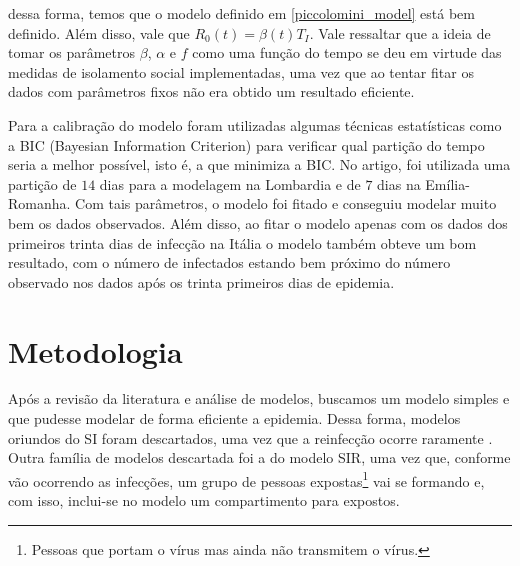 \documentclass{article}
\begin{document}
\noindent dessa forma, temos que o modelo definido em \ref{piccolomini_model} está bem definido. Além disso, vale que $R_0(t) = \beta(t)T_I$. Vale ressaltar que a ideia de tomar os parâmetros $\beta$, $\alpha$ e $f$ como uma função do tempo se deu em virtude das medidas de isolamento social implementadas, uma vez que ao tentar fitar os dados com parâmetros fixos não era obtido um resultado eficiente.

Para a calibração do modelo foram utilizadas algumas técnicas estatísticas como a BIC (Bayesian Information Criterion) para verificar qual partição do tempo seria a melhor possível, isto é, a que minimiza a BIC. No artigo, foi utilizada uma partição de $14$ dias para a modelagem na Lombardia e de $7$ dias na Emília-Romanha. Com tais parâmetros, o modelo foi fitado e conseguiu modelar muito bem os dados observados. Além disso, ao fitar o modelo apenas com os dados dos primeiros trinta dias de infecção na Itália o modelo também obteve um bom resultado, com o número de infectados estando bem próximo do número observado nos dados após os trinta primeiros dias de epidemia.

\section{Metodologia}

% 
Após a revisão da literatura e análise de modelos, buscamos um modelo simples e que pudesse modelar de forma eficiente a epidemia. Dessa forma, modelos oriundos do SI foram descartados, uma vez que a reinfecção ocorre raramente \cite{again}. Outra família de modelos descartada foi a do modelo SIR, uma vez que, conforme vão ocorrendo as infecções, um grupo de pessoas expostas\footnote{Pessoas que portam o vírus mas ainda não transmitem o vírus.} vai se formando e, com isso, inclui-se no modelo um compartimento para expostos.
\end{document}
